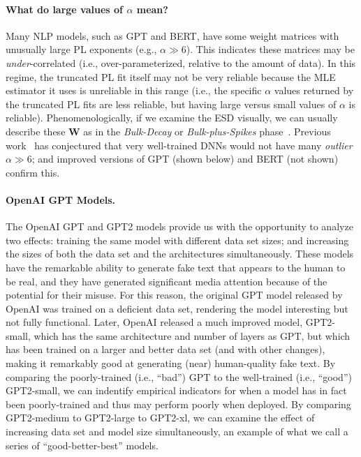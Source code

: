 \paragraph{What do large values of $\alpha$ mean?}

Many NLP models, such as GPT and BERT, have some weight matrices with unusually large PL exponents (e.g., $\alpha\gg 6$).
This indicates these matrices may be \emph{under}-correlated (i.e., over-parameterized, relative to the amount of data).
In this regime, the truncated PL fit itself may not be very reliable because the MLE estimator it uses is unreliable in this range (i.e., the specific $\alpha$ values returned by the truncated PL fits are less reliable, but having large versus small values of $\alpha$ is reliable).
Phenomenologically, if we examine the ESD visually, we can usually describe these $\mathbf{W}$ as in the \emph{Bulk-Decay} or \emph{Bulk-plus-Spikes} phase~\cite{MM18_TR,MM19_HTSR_ICML}.
Previous work~\cite{MM18_TR,MM19_HTSR_ICML} has conjectured that very well-trained DNNs would not have many \emph{outlier} $\alpha\gg 6$; and improved versions of GPT (shown below) and BERT (not shown) confirm this.


\paragraph{OpenAI GPT Models.}

The OpenAI GPT and GPT2 models provide us with the opportunity to analyze two effects: training the same model with different data set sizes; and increasing the sizes of both the data set and the architectures simultaneously.
These models have the remarkable ability to generate fake text that appears to the human to be real, and they have generated significant media attention because of the potential for their misuse.
For this reason, the original GPT model released by OpenAI was trained on a deficient data set, rendering the model interesting but not fully functional.  
Later, OpenAI released a much improved model, GPT2-small, which has the same architecture and number of layers as GPT, but which has been trained on a larger and better data set (and with other changes), making it remarkably good at generating (near) human-quality fake text.  
%
By comparing the poorly-trained (i.e., ``bad'') GPT to the well-trained (i.e., ``good'') GPT2-small, we can indentify empirical indicators for when a model has in fact been poorly-trained and thus may perform poorly when deployed.
By comparing GPT2-medium to GPT2-large to GPT2-xl, we can examine the effect of increasing data set and model size simultaneously,
an example of what we call a series of ``good-better-best'' models.

